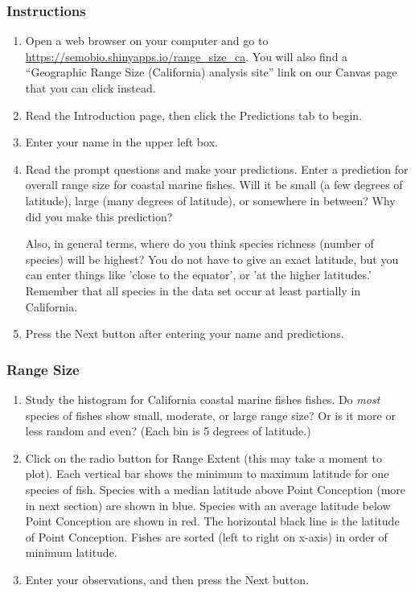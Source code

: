 \documentclass[11pt]{article}
\begin{document}
\subsubsection*{Instructions}

\begin{enumerate}
	\item Open a web browser on your computer and go to \url{https://semobio.shinyapps.io/range_size_ca}. You will also find a “Geographic Range Size (California) analysis site” link on our Canvas page that you can click instead.
	
	\item Read the Introduction page, then click the Predictions tab to begin. 
	
	\item Enter your name in the upper left box.
	
	\item Read the prompt questions and make your predictions. Enter a prediction for overall range size for coastal marine fishes. Will it be small (a few degrees of latitude), large (many degrees of latitude), or somewhere in between? Why did you make this prediction? 
	
	Also, in general terms, where do you think species richness (number of species) will be highest? You do not have to give an exact latitude, but you can enter things like 'close to the equator', or 'at the higher latitudes.' Remember that all species in the data set occur at least partially in California.
	
			
	\item Press the Next button after entering your name and predictions.
	
\end{enumerate}

\subsubsection*{Range Size}

\begin{enumerate}[resume]
	\item Study the histogram for California coastal marine fishes fishes. Do \emph{most} species of fishes show small, moderate, or
	large range size? Or is it more or less random and even? (Each bin is 5 degrees of latitude.)
	
	\item Click on the radio button for Range Extent (this may take a moment to plot). Each vertical bar shows the minimum to maximum latitude for one species of fish. Species with a median latitude above Point Conception (more in next section) are shown in blue. Species with an average latitude below Point Conception are shown in red. The horizontal black line is the latitude of Point Conception. Fishes are sorted (left to right on x-axis) in order of minimum latitude.
	
	\item Enter your observations, and then press the Next button.
		
\end{enumerate}
\end{document}
